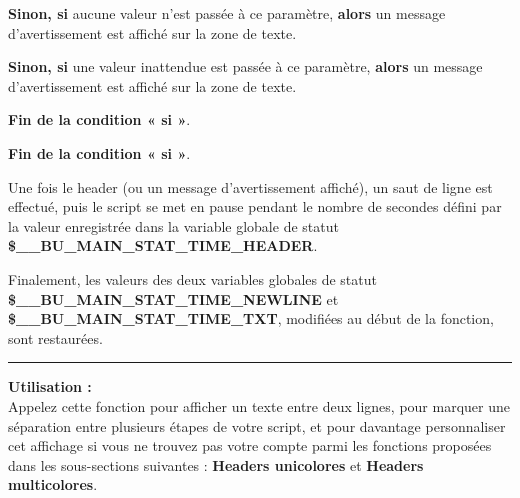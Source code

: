 \documentclass[a4paper,10pt]{article}
\begin{document}
\begin{itemize}
{{                \setlength{\parskip}{1em}

                \begin{justify}
                    \textbf{\color{cond}Sinon, si} aucune valeur n'est passée à ce paramètre, \textbf{\color{cond}alors} un message d'avertissement est affiché sur la zone de texte.
                \end{justify}

                \begin{justify}
                    \textbf{\color{cond}Sinon, si} une valeur inattendue est passée à ce paramètre, \textbf{\color{cond}alors} un message d'avertissement est affiché sur la zone de texte.
                \end{justify}

                \begin{justify}
                    \textbf{\color{cond}Fin de la condition « si »}.
                \end{justify}
            }
        }
    \end{itemize}

    \begin{justify}
        \textbf{\color{cond}Fin de la condition « si »}.
    \end{justify}

    \setlength{\parskip}{2em}


    \begin{justify}
        Une fois le header (ou un message d'avertissement affiché), un saut de ligne est effectué, puis le script se met en pause pendant le nombre de secondes défini par la valeur enregistrée dans la variable globale de statut \textbf{\color{vars}\$\_\_BU\_MAIN\_STAT\_TIME\_HEADER}.
    \end{justify}

    \setlength{\parskip}{2em}

    \begin{justify}
        Finalement, les valeurs des deux variables globales de statut \textbf{\color{vars}\$\_\_BU\_MAIN\_STAT\_TIME\_NEWLINE} et \textbf{\color{vars}\$\_\_BU\_MAIN\_STAT\_TIME\_TXT}, modifiées au début de la fonction, sont restaurées.
    \end{justify}

    \setlength{\parskip}{1em}

    \par\noindent\rule{\textwidth}{0.4pt}

    \begin{justify}
        \textbf{Utilisation :}\\[1\baselineskip]
        Appelez cette fonction pour afficher un texte entre deux lignes, pour marquer une séparation entre plusieurs étapes de votre script, et pour davantage personnaliser cet affichage si vous ne trouvez pas votre compte parmi les fonctions proposées dans les sous-sections suivantes : \textbf{\color{sec2}Headers unicolores} et \textbf{\color{sec2}Headers multicolores}.
    \end{justify}
\end{document}
